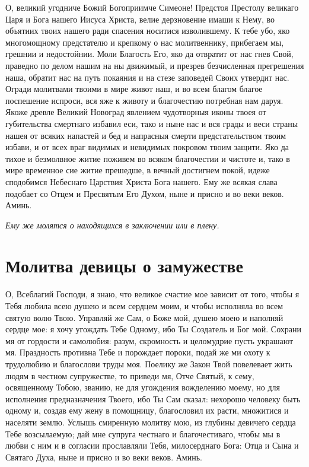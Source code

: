 О, великий угодниче Божий Богоприимче Симеоне! Предстоя Престолу великаго Царя и Бога нашего Иисуса Христа, велие дерзновение имаши к Нему, во объятиих твоих нашего ради спасения носитися изволившему. К тебе убо, яко многомощному предстателю и крепкому о нас молитвеннику, прибегаем мы, грешнии и недостойнии. Моли Благость Его, яко да отвратит от нас гнев Свой, праведно по делом нашим на ны движимый, и презрев безчисленная прегрешения наша, обратит нас на путь покаяния и на стезе заповедей Своих утвердит нас. Огради молитвами твоими в мире живот наш, и во всем благом благое поспешение испроси, вся яже к животу и благочестию потребная нам даруя. Якоже древле Великий Новоград явлением чудотворныя иконы твоея от губительства смертнаго избавил еси, тако и ныне нас и вся грады и веси страны нашея от всяких напастей и бед и напрасныя смерти предстательством твоим избави, и от всех враг видимых и невидимых покровом твоим защити. Яко да тихое и безмолвное житие поживем во всяком благочестии и чистоте и, тако в мире временное сие житие прешедше, в вечный достигнем покой, идеже сподобимся Небеснаго Царствия Христа Бога нашего. Ему же всякая слава подобает со Отцем и Пресвятым Его Духом, ныне и присно и во веки веков. Аминь.

\itshape Ему же молятся о находящихся в заключении или в плену.\normalfont{} 
\mychapterending


 

\section{Молитва девицы о замужестве}
 

О, Всеблагий Господи, я знаю, что великое счастие мое зависит от того, чтобы я Тебя любила всею душею и всем сердцем моим, и чтобы исполняла во всем святую волю Твою. Управляй же Сам, о Боже мой, душею моею и наполняй сердце мое: я хочу угождать Тебе Одному, ибо Ты Создатель и Бог мой. Сохрани мя от гордости и самолюбия: разум, скромность и целомудрие пусть украшают мя. Праздность противна Тебе и порождает пороки, подай же ми охоту к трудолюбию и благослови труды моя. Поелику же Закон Твой повелевает жить людям в честном супружестве, то приведи мя, Отче Святый, к сему, освященному Тобою, званию, не для угождения вожделению моему, но для исполнения предназначения Твоего, ибо Ты Сам сказал: нехорошо человеку быть одному и, создав ему жену в помощницу, благословил их расти, множитися и населяти землю. Услышь смиренную молитву мою, из глубины девичего сердца Тебе возсылаемую; дай мне супруга честнаго и благочестиваго, чтобы мы в любви с ним и в согласии прославляли Тебя, милосерднаго Бога: Отца и Сына и Святаго Духа, ныне и присно и во веки веков. Аминь.


